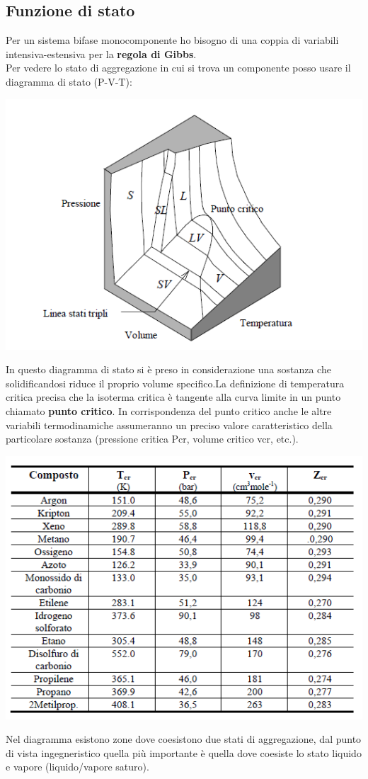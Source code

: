 \documentclass[a4paper,12pt,titlepage]{article}
\begin{document}
\subsection{Funzione di stato}
Per un sistema bifase monocomponente ho bisogno di una coppia di variabili intensiva-estensiva per la \textbf{regola di Gibbs}. \\
Per vedere lo stato di aggregazione in cui si trova un componente posso usare il diagramma di stato (P-V-T):
\begin{center}
\includegraphics[scale=0.5]{state_diagram}\\
\end{center} 
In questo diagramma di stato si è preso in considerazione una sostanza che solidificandosi riduce il proprio volume specifico.La definizione di temperatura critica precisa che la isoterma critica è tangente alla curva limite in un punto chiamato \textbf{punto critico}. In corrispondenza del punto critico anche le altre variabili termodinamiche assumeranno un preciso valore caratteristico della particolare sostanza (pressione critica Pcr, volume critico vcr, etc.).
\begin{center}
\includegraphics[scale=0.9]{tcr}

\end{center}
\clearpage
Nel diagramma esistono zone dove coesistono due stati di aggregazione, dal punto di vista ingegneristico quella più importante è quella dove coesiste lo stato liquido e vapore (liquido/vapore saturo).
\end{document}
